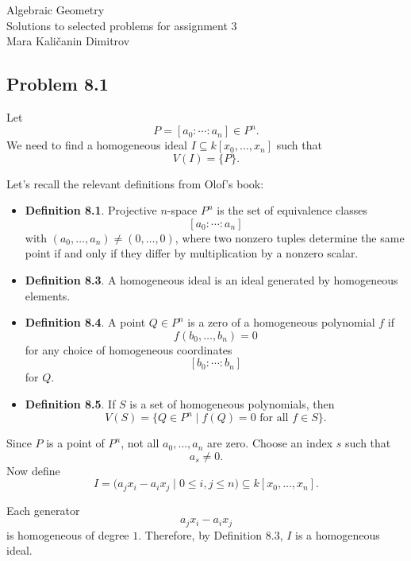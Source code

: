\documentclass[a4paper,12pt]{article}
\theoremstyle{plain}
\theoremstyle{definition}
\theoremstyle{remark}
\begin{document}
\begin{center}
\huge Algebraic Geometry\\
\vspace{0.2cm}
\Large Solutions to selected problems for assignment 3 \\  \vspace{0.5cm}
Mara Kali\v{c}anin Dimitrov
\vspace{0.5cm}
\end{center}



\subsection*{Problem 8.1}

Let
\[
P=[a_0:\cdots:a_n]\in P^n.
\]
We need to find a homogeneous ideal $I\subseteq k[x_0,\dots,x_n]$ such that
\[
V(I)=\{P\}.
\]

\medskip

Let's recall the relevant definitions from Olof's book:
\begin{itemize}
\item \textbf{Definition 8.1}. Projective $n$-space $P^n$ is the set of equivalence classes
\[
[a_0:\cdots:a_n]
\]
with $(a_0,\dots,a_n)\neq (0,\dots,0)$, where two nonzero tuples determine the same point if and only if they differ by multiplication by a nonzero scalar.

\item \textbf{Definition 8.3}. A homogeneous ideal is an ideal generated by homogeneous elements.

\item \textbf{Definition 8.4}. A point $Q\in P^n$ is a zero of a homogeneous polynomial $f$ if
\[
f(b_0,\dots,b_n)=0
\]
for any choice of homogeneous coordinates
\[
[b_0:\cdots:b_n]
\]
for $Q$.

\item \textbf{Definition 8.5}. If $S$ is a set of homogeneous polynomials, then
\[
V(S)=\{Q\in P^n \mid f(Q)=0 \text{ for all } f\in S\}.
\]
\end{itemize}

\medskip

Since $P$ is a point of $P^n$, not all $a_0,\dots,a_n$ are zero. Choose an index $s$ such that
\[
a_s\neq 0.
\]
Now define
\[
I=\bigl(a_jx_i-a_ix_j \mid 0\le i,j\le n\bigr)\subseteq k[x_0,\dots,x_n].
\] 

Each generator
\[
a_jx_i-a_ix_j
\]
is homogeneous of degree $1$. Therefore, by Definition 8.3, $I$ is a homogeneous ideal.
\end{document}

